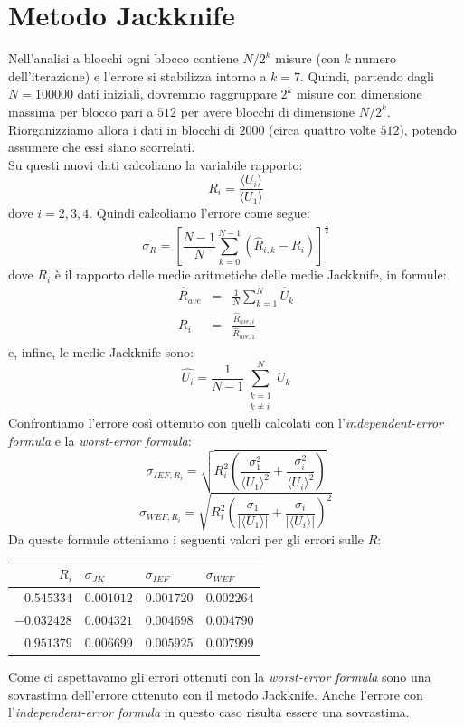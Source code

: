 \documentclass[a4paper,10pt]{article}
\newcommand{\abs}[1]{\lvert#1\rvert}
\begin{document}
\section{Metodo Jackknife}
Nell'analisi a blocchi ogni blocco contiene $N/2^k$ misure (con $k$ numero dell'iterazione) e l'errore si stabilizza intorno a $k=7$. Quindi, partendo dagli $N=100000$ dati iniziali, dovremmo raggruppare $2^k$ misure con dimensione massima per blocco pari a $512$ per avere blocchi di dimensione $N/2^k$. Riorganizziamo allora i dati in blocchi di $2000$ (circa quattro volte $512$), potendo assumere che essi siano scorrelati.\\
Su questi nuovi dati calcoliamo la variabile rapporto:
\begin{equation}
R_i=\frac{\langle U_i \rangle}{\langle U_1 \rangle}
\end{equation}
dove $i=2,3,4$. Quindi calcoliamo l'errore come segue:
\begin{equation}
\sigma_R = \left[ \frac{N-1}{N} \sum_{k=0}^{N-1} (\hat{R}_{i,k}-R_i) \right]^{\frac{1}{2}}
\end{equation}
dove $R_i$ è il rapporto delle medie aritmetiche delle medie Jackknife, in formule:
\begin{eqnarray*}
	\hat{R}_{ave}&=&\frac{1}{N} \sum_{k=1}^N \hat{U}_k\\
	R_i&=&\frac{\hat{R}_{ave,i}}{\hat{R}_{ave,1}}
\end{eqnarray*}
e, infine, le medie Jackknife sono:
\begin{equation}
\hat{U_i}= \frac{1}{N-1} \sum_{\substack{k=1 \\ k \neq i}}^{N} U_k
\end{equation}
Confrontiamo l'errore così ottenuto con quelli calcolati con l'\textit{independent-error formula} e la \textit{worst-error formula}:
\begin{equation}
\sigma_{IEF,R_i}= \sqrt{R_i^2 \left( \frac{\sigma_1^2}{\langle U_1 \rangle^2} + \frac{\sigma_i^2}{\langle U_i \rangle^2}  \right)}
\end{equation}
\begin{equation}
\sigma_{WEF,R_i}= \sqrt{R_i^2 \left( \frac{\sigma_1}{\abs{\langle U_1 \rangle}} + \frac{\sigma_i}{\abs{\langle U_i \rangle}}  \right)^2}
\end{equation}
Da queste formule otteniamo i seguenti valori per gli errori sulle $R$:
\medskip
\begin{table}[H]
	\centering
	\begin{tabular}{rlll} 
	\hline
	$R_i$ & $\sigma_{JK}$      & $\sigma_{IEF}$   & $\sigma_{WEF}$ \\
	\hline
	$0.545334$  &  $0.001012$	& $0.001720$  &  $0.002264$\\
	$-0.032428$  &  $0.004321$	& $0.004698$  &  $0.004790$\\
	$0.951379$  &  $0.006699$	& $0.005925$  &  $0.007999$\\
	\hline
	\end{tabular}
\end{table}
\medskip
\noindent Come ci aspettavamo gli errori ottenuti con la \textit{worst-error formula} sono una sovrastima dell'errore ottenuto con il metodo Jackknife. Anche l'errore con l'\textit{independent-error formula} in questo caso risulta essere una sovrastima.
\end{document}
